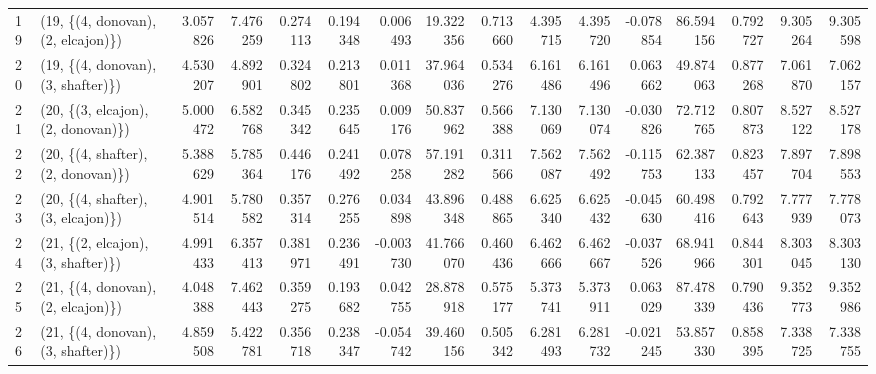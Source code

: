 \begin{tabular}{llrrrrrrrrrrrrrr}
19 &  (19, \{(4, donovan), (2, elcajon)\}) &  3.057826 &  7.476259 &   0.274113 &  0.194348 &  0.006493 &  19.322356 &  0.713660 &   4.395715 &  4.395720 & -0.078854 &   86.594156 &  0.792727 &   9.305264 &   9.305598 \\
20 &  (19, \{(4, donovan), (3, shafter)\}) &  4.530207 &  4.892901 &   0.324802 &  0.213801 &  0.011368 &  37.964036 &  0.534276 &   6.161486 &  6.161496 &  0.063662 &   49.874063 &  0.877268 &   7.061870 &   7.062157 \\
21 &  (20, \{(3, elcajon), (2, donovan)\}) &  5.000472 &  6.582768 &   0.345342 &  0.235645 &  0.009176 &  50.837962 &  0.566388 &   7.130069 &  7.130074 & -0.030826 &   72.712765 &  0.807873 &   8.527122 &   8.527178 \\
22 &  (20, \{(4, shafter), (2, donovan)\}) &  5.388629 &  5.785364 &   0.446176 &  0.241492 &  0.078258 &  57.191282 &  0.311566 &   7.562087 &  7.562492 & -0.115753 &   62.387133 &  0.823457 &   7.897704 &   7.898553 \\
23 &  (20, \{(4, shafter), (3, elcajon)\}) &  4.901514 &  5.780582 &   0.357314 &  0.276255 &  0.034898 &  43.896348 &  0.488865 &   6.625340 &  6.625432 & -0.045630 &   60.498416 &  0.792643 &   7.777939 &   7.778073 \\
24 &  (21, \{(2, elcajon), (3, shafter)\}) &  4.991433 &  6.357413 &   0.381971 &  0.236491 & -0.003730 &  41.766070 &  0.460436 &   6.462666 &  6.462667 & -0.037526 &   68.941966 &  0.844301 &   8.303045 &   8.303130 \\
25 &  (21, \{(4, donovan), (2, elcajon)\}) &  4.048388 &  7.462443 &   0.359275 &  0.193682 &  0.042755 &  28.878918 &  0.575177 &   5.373741 &  5.373911 &  0.063029 &   87.478339 &  0.790436 &   9.352773 &   9.352986 \\
26 &  (21, \{(4, donovan), (3, shafter)\}) &  4.859508 &  5.422781 &   0.356718 &  0.238347 & -0.054742 &  39.460156 &  0.505342 &   6.281493 &  6.281732 & -0.021245 &   53.857330 &  0.858395 &   7.338725 &   7.338755 \\
\bottomrule
\end{tabular}
